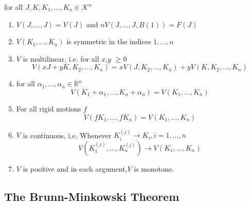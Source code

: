 \documentclass[oneside]{book}
\theoremstyle{definition}
\begin{document}
 for all $J, K, K_{1}, \ldots, K_{n} 
  \in \mathcal{K}^{n}$ \\ 
  \begin{enumerate}
      
  \item
$V(J, \ldots, J)=V(J)$ and $ nV(J, \ldots, J, B(1))=F(J)$ 
\item 
$V\left(K_{1}, \ldots, K_{n}\right)$ is symmetric in the indices $1,\ldots, n$
\item
 $V$ is multilinear, i.e.
 for all $ x$,$y$ $\geq 0 $
$$
V\left(x J+y K, K_{2}, \ldots, K_{n}\right)=x V\left(J, K_{2}, \ldots, K_{n}\right)+y V\left(K, K_{2}, \ldots, K_{n}\right)
$$
\item
for all $\alpha_{1}, \ldots, \alpha_{n} \in \mathbb{R}^{n}$
$$
V\left(K_{1}+\alpha_{1}, \ldots, K_{n}+\alpha_{n}\right)=V\left(K_{1}, \ldots, K_{n}\right)
$$
\item  
For all rigid motions $f$ 
$$ 
V\left(f K_{1}, \ldots, f K_{n}\right)=V\left(K_{1}, \ldots, K_{n}\right)
$$ 
\item
$V$ is continuous, i.e.
Whenever $K_{i}^{(j)} \rightarrow K_{i}, i=1, \ldots, n$
\[
V\left(K_{1}^{(j)}, \ldots, K_{n}^{(j)}\right) \rightarrow V\left(K_{1}, \ldots, K_{n}\right)
\]
\item $V$ is positive and in each argument,$V$ is monotone.
 
 
  \end{enumerate}
 
 
 
 
 \subsection{The Brunn-Minkowski Theorem}
 
\end{document}
